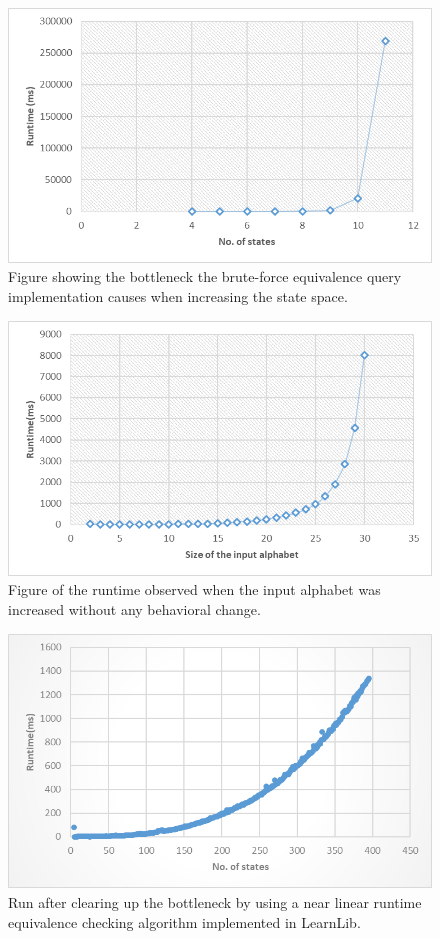 \begin{figure}
	\centering
	\includegraphics[width=0.7\linewidth]{figures/stateruntime}
	\caption{Figure showing the bottleneck the brute-force equivalence query implementation causes when increasing the state space.}
	\label{fig:stateruntime}
\end{figure}

\begin{figure}
	\centering
	\includegraphics[width=0.7\linewidth]{figures/inputruntime}
	\caption{Figure of the runtime observed when the input alphabet was increased without any behavioral change.}
	\label{fig:inputruntime}
\end{figure}



\begin{figure}
	\centering
	\includegraphics[width=0.7\linewidth]{figures/inputruntime1}
	\caption{Run after clearing up the bottleneck by using a near linear runtime equivalence checking algorithm implemented in LearnLib.}
	\label{fig:inputruntime1}
\end{figure}
